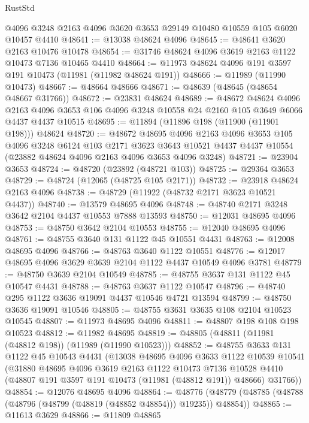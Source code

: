 \begin{lexlean}{RustStd}
\begin{coremodule}
    @4096
    @3248
    @2163
    @4096
    @3620
    @3653
    @29149
    @10480
    @10559
    @105
    @6020
    @10457
    @4410
@48641 := @13038 @48624 @4096
@48645 := @48641 @3620 @2163 @10476 @10478
@48654 := @31746 @48624 @4096 @3619 @2163 @1122 @10473 @7136 @10465 @4410
@48664 := @11973 @48624 @4096 @191 @3597 @191 @10473 (@11981 (@11982 @48624 @191))
@48666 := @11989 (@11990 @10473)
@48667 := @48664 @48666
@48671 := @48639 (@48645 (@48654 @48667 @31766))
@48672 := @23831 @48624
@48689 := @48672
    @48624
    @4096
    @2163
    @4096
    @3653
    @106
    @4096
    @3248
    @10558
    @24
    @2160
    @105
    @3649
    @6066
    @4437
    @4437
    @10515
@48695 := @11894 (@11896 @198 (@11900 (@11901 @198))) @48624
@48720 := @48672
    @48695
    @4096
    @2163
    @4096
    @3653
    @105
    @4096
    @3248
    @6124
    @103
    @2171
    @3623
    @3643
    @10521
    @4437
    @4437
    @10554
    (@23882 @48624 @4096 @2163 @4096 @3653 @4096 @3248)
@48721 := @23904 @3653
@48724 := @48720 (@23892 (@48721 @103))
@48725 := @29364 @3653
@48729 := @48724 (@12065 (@48725 @105 @2171))
@48732 := @23918 @48624 @2163 @4096
@48738 := @48729 (@11922 (@48732 @2171 @3623 @10521 @4437))
@48740 := @13579 @48695 @4096
@48748 := @48740 @2171 @3248 @3642 @2104 @4437 @10553 @7888 @13593
@48750 := @12031 @48695 @4096
@48753 := @48750 @3642 @2104 @10553
@48755 := @12040 @48695 @4096
@48761 := @48755 @3640 @131 @1122 @45 @10551 @4431
@48763 := @12008 @48695 @4096
@48766 := @48763 @3640 @1122 @10551
@48776 := @12017 @48695 @4096 @3629 @3639 @2104 @1122 @4437 @10549 @4096 @3781
@48779 := @48750 @3639 @2104 @10549
@48785 := @48755 @3637 @131 @1122 @45 @10547 @4431
@48788 := @48763 @3637 @1122 @10547
@48796 := @48740 @295 @1122 @3636 @19091 @4437 @10546 @4721 @13594
@48799 := @48750 @3636 @19091 @10546
@48805 := @48755 @3631 @3635 @108 @2104 @10523 @10545
@48807 := @11973 @48695 @4096
@48811 := @48807 @198 @108 @198 @10523
@48812 := @11982 @48695
@48819 := @48805 (@48811 (@11981 (@48812 @198)) (@11989 (@11990 @10523)))
@48852 := @48755
    @3633
    @131
    @1122
    @45
    @10543
    @4431
    (@13038
      @48695
      @4096
      @3633
      @1122
      @10539
      @10541
      (@31880
        @48695
        @4096
        @3619
        @2163
        @1122
        @10473
        @7136
        @10528
        @4410
        (@48807 @191 @3597 @191 @10473 (@11981 (@48812 @191)) @48666)
        @31766))
@48854 := @12076 @48695 @4096
@48864 := @48776 (@48779 (@48785 (@48788 (@48796 (@48799 (@48819 (@48852 @48854))) @19235)) @48854))
@48865 := @11613 @3629
@48866 := @11809 @48865

\end{coremodule}
\end{lexlean}
